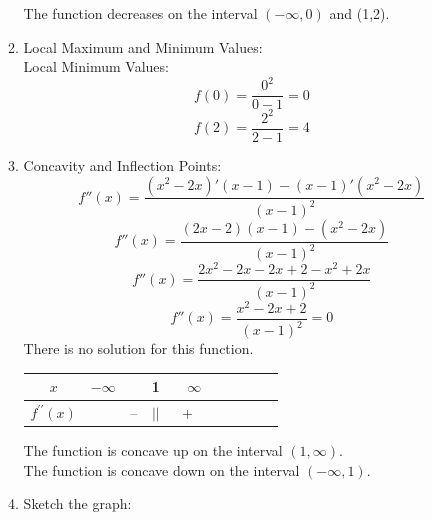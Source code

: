 \documentclass[12pt]{article}
\begin{document}
\begin{enumerate}
\begin{enumerate}
                        The function decreases on the interval $(-\infty, 0)$ and (1,2).
                    \item Local Maximum and Minimum Values:\\
                    Local Minimum Values:    
                        \[f(0) = \frac{0^2}{0-1} = 0\]
                        \[f(2) = \frac{2^2}{2-1} = 4\]
                    \item Concavity and Inflection Points:
                        \[f''(x) = \frac{(x^2- 2x)'(x-1) - (x-1)'(x^2-2x)}{(x-1)^2}\]
                        \[f''(x) = \frac{(2x- 2)(x-1) - (x^2-2x)}{(x-1)^2}\]
                        \[f''(x) = \frac{2x^2 - 2x -2x + 2 - x^2 + 2x}{(x-1)^2}\]
                        \[f''(x) = \frac{x^2 - 2x + 2}{(x-1)^2} = 0\]
                        There is no solution for this function.
                        \begin{center}
                            \begin{tabular}{c c c c c c c c c c}
                                $x$ & $-\infty$ & ~ & 1 & ~ $\infty$ \\ 
                                \hline 
                                $f^{\prime\prime} (x)$ & ~ & -- & $||$ & +\\ 
                            \end{tabular}    
                        \end{center}
                        The function is concave up on the interval $(1, \infty)$.\\
                        The function is concave down on the interval $(-\infty, 1)$.
                    \item Sketch the graph:
                    \begin{figure}[!h]
                        \centering
                        \begin{framed}
\end{framed}
\end{figure}
\end{enumerate}
\end{enumerate}
\end{document}

